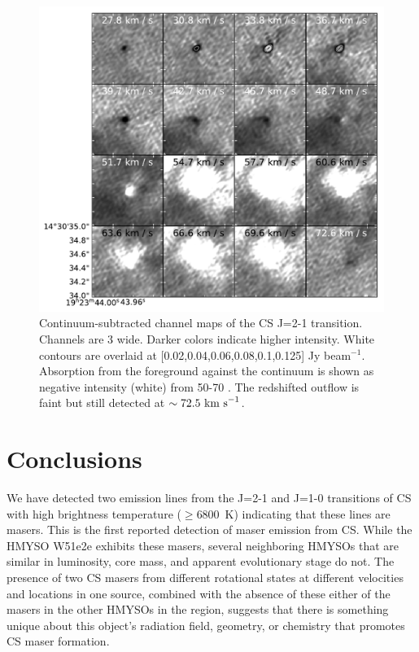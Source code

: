 \documentclass[twocolumn]{aastex62}
\begin{document}
\begin{figure}
    \includegraphics[]{figures/CS_maser_channel_maps.pdf}
    \caption{Continuum-subtracted channel maps of the CS J=2-1 transition.
    Channels are 3 \kms wide.  Darker colors indicate higher intensity.  White
    contours are overlaid at [0.02,0.04,0.06,0.08,0.1,0.125] Jy beam$^{-1}$.
    Absorption from the foreground against the continuum is shown as negative
    intensity (white) from 50-70 \kms.  The redshifted outflow is faint but
    still detected at ${\sim72.5~\textrm{km~s}^{-1}}$.
    }
    \label{fig:channelmaps}
\end{figure}

\section{Conclusions}
We have detected two emission lines from the J=2-1 and J=1-0 transitions of CS
with high brightness temperature ($\geq$6800~K) indicating that these lines are masers.
This is the first reported detection of maser emission from CS.
While the HMYSO W51e2e exhibits these masers, several neighboring HMYSOs that
are similar in luminosity, core mass, and apparent evolutionary stage
do not.  The presence of two CS masers from different rotational states
at different velocities and locations in one source, 
 combined with the absence of these
either of the masers in the other HMYSOs in the region, suggests that
there is something unique about this object's radiation field, geometry, or
chemistry that promotes CS maser formation.
\end{document}
